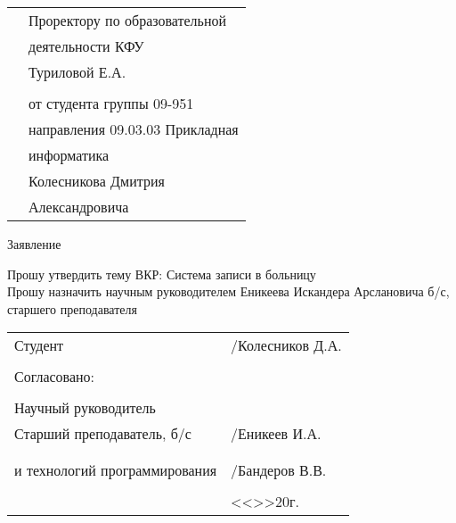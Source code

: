 \documentclass[a4paper]{article}
\begin{document}
    \begin{titlepage}
        \begin{xltabular}{\textwidth} {
                >{\hsize} X
                >{\hsize} X }
            & Проректору по образовательной \\
            & деятельности КФУ \\
            & Туриловой Е.А. \\
            & \\
            & от студента группы 09-951 \\
            & направления 09.03.03 Прикладная \\
            & информатика \\
            & Колесникова Дмитрия \\
            & Александровича \\
        \end{xltabular}

        \begin{center}
            Заявление
        \end{center}

        \begin{flushleft}
            Прошу утвердить тему ВКР: Система записи в больницу \\
            Прошу назначить научным руководителем Еникеева Искандера Арслановича б/с, старшего преподавателя
        \end{flushleft}

        \vfill

        \begin{xltabular}{\textwidth} {
                >{\hsize} X
                >{\hsize} X }
            Студент & \underline{\hspace{3cm}}/Колесников Д.А. \\
            & \\
            Согласовано: & \\
            & \\
            Научный руководитель & \\
            Старший преподаватель, б/с & \underline{\hspace{3cm}}/Еникеев И.А. \\
            & \\
             \\
            и технологий программирования & \underline{\hspace{3cm}}/Бандеров В.В. \\
            & \\
            & <<\underline{\hspace{1cm}}>>\underline{\hspace{3cm}}20\underline{\hspace{1cm}}г. \\
        \end{xltabular}
    \end{titlepage}
\end{document}
